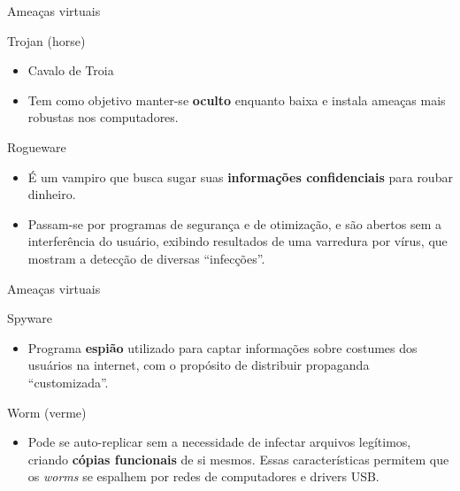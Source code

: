 \begin{frame}{Ameaças virtuais}
	\begin{block}{Trojan (horse)}
		\begin{itemize}
			\item Cavalo de Troia
			\item Tem como objetivo manter-se \textbf{oculto} enquanto baixa e instala ameaças mais robustas nos computadores.
		\end{itemize}
	\end{block}

	\begin{block}{Rogueware}
		\begin{itemize}
			\item É um vampiro que busca sugar suas \textbf{informações confidenciais} para roubar dinheiro.
			\item Passam-se por programas de segurança e de otimização, e são abertos sem a interferência do usuário, exibindo resultados de uma varredura por vírus, que mostram a detecção de diversas “infecções”.
		\end{itemize}
	\end{block}
\end{frame}


\begin{frame}{Ameaças virtuais}
	\begin{block}{Spyware}
		\begin{itemize}
			\item Programa \textbf{espião} utilizado para captar informações sobre costumes dos usuários na internet, com o propósito de distribuir propaganda “customizada”.
		\end{itemize}
	\end{block}

	\begin{block}{Worm (verme)}
		\begin{itemize}
			\item Pode se auto-replicar sem a necessidade de infectar arquivos legítimos, criando \textbf{cópias funcionais} de si mesmos. Essas características permitem que os \textit{worms} se espalhem por redes de computadores e drivers USB.
		\end{itemize}
	\end{block}
\end{frame}


